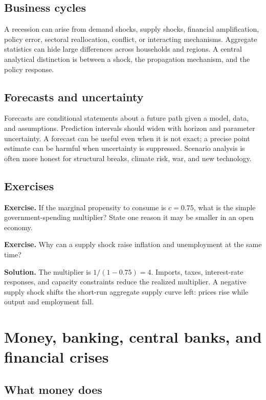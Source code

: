 \documentclass[11pt,oneside,openany]{book}
\newcommand{\exercise}[1]{\textbf{Exercise.} #1}
\newcommand{\solution}[1]{\textbf{Solution.} #1}
\begin{document}
\section{Business cycles}

A recession can arise from demand shocks, supply shocks, financial amplification, policy error, sectoral reallocation, conflict, or interacting mechanisms. Aggregate statistics can hide large differences across households and regions. A central analytical distinction is between a shock, the propagation mechanism, and the policy response.

\section{Forecasts and uncertainty}

Forecasts are conditional statements about a future path given a model, data, and assumptions. Prediction intervals should widen with horizon and parameter uncertainty. A forecast can be useful even when it is not exact; a precise point estimate can be harmful when uncertainty is suppressed. Scenario analysis is often more honest for structural breaks, climate risk, war, and new technology.

\section{Exercises}

\exercise{If the marginal propensity to consume is $c=0.75$, what is the simple government-spending multiplier? State one reason it may be smaller in an open economy.}

\exercise{Why can a supply shock raise inflation and unemployment at the same time?}

\solution{The multiplier is $1/(1-0.75)=4$. Imports, taxes, interest-rate responses, and capacity constraints reduce the realized multiplier. A negative supply shock shifts the short-run aggregate supply curve left: prices rise while output and employment fall.}

\chapter{Money, banking, central banks, and financial crises}
\label{ch:money}

\section{What money does}
\end{document}

